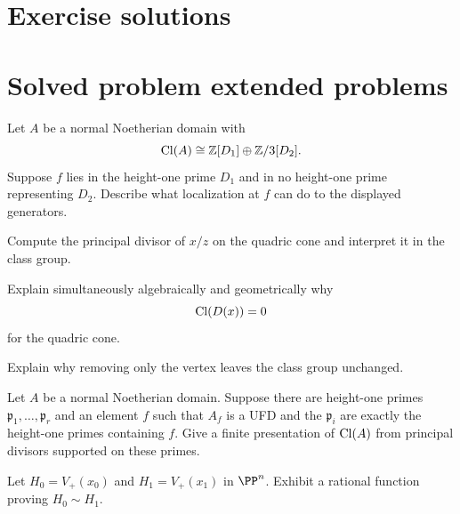 \section{Exercise solutions}

\fi

\section{Solved problem extended problems}

\begin{problem}\label{prob:vi41-01}
Let \(A\) be a normal Noetherian domain with
\[
 \operatorname{Cl}(A)\cong\mathbb Z[D_1]\oplus\mathbb Z/3[D_2].
\]
Suppose \(f\) lies in the height-one prime \(D_1\) and in no height-one prime representing \(D_2\). Describe what localization at \(f\) can do to the displayed generators.
\end{problem}

\begin{problem}\label{prob:vi41-02}
Compute the principal divisor of \(x/z\) on the quadric cone and interpret it in the class group.
\end{problem}

\begin{problem}\label{prob:vi41-03}
Explain simultaneously algebraically and geometrically why
\[
  \operatorname{Cl}(D(x))=0
\]
for the quadric cone.
\end{problem}

\begin{problem}\label{prob:vi41-04}
Explain why removing only the vertex leaves the class group unchanged.
\end{problem}

\begin{problem}\label{prob:vi41-05}
Let \(A\) be a normal Noetherian domain. Suppose there are height-one primes \(\mathfrak p_1,\ldots,\mathfrak p_r\) and an element \(f\) such that \(A_f\) is a UFD and the \(\mathfrak p_i\) are exactly the height-one primes containing \(f\). Give a finite presentation of \(\operatorname{Cl}(A)\) from principal divisors supported on these primes.
\end{problem}

\begin{problem}\label{prob:vi41-06}
Let \(H_0=V_+(x_0)\) and \(H_1=V_+(x_1)\) in \(\PP^n\). Exhibit a rational function proving \(H_0\sim H_1\).
\end{problem}

